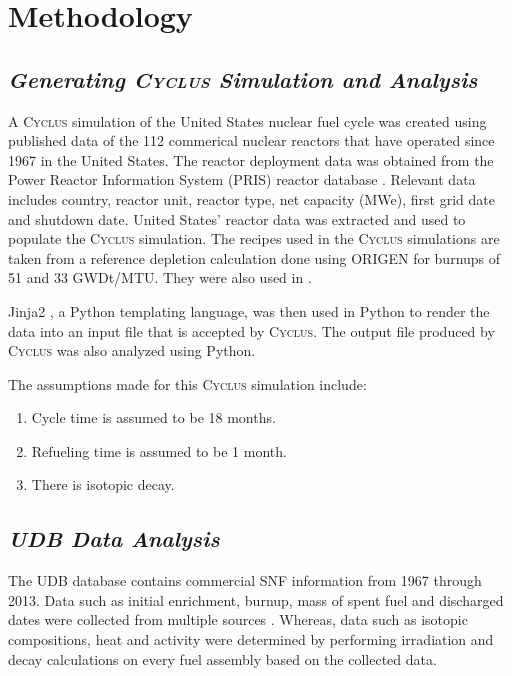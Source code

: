 \documentclass{anstrans}
\newcommand{\Cyclus}{\textsc{Cyclus}\xspace}%
\begin{document}
\section{Methodology}
\subsection{\textit{Generating \Cyclus Simulation and Analysis}}
A \Cyclus simulation of the United States nuclear fuel cycle was created using published data of the 112 commerical nuclear reactors that have operated since 1967 in the United States. The reactor deployment data was obtained from the Power Reactor Information System (PRIS) reactor database \cite{IAEA_pris_2017}. Relevant data includes country, reactor unit, reactor type, net capacity (MWe), first grid date and shutdown date. United States' reactor data was extracted and used to populate the \Cyclus simulation. The recipes used in the \Cyclus simulations are taken from a reference depletion calculation done using ORIGEN \cite{bell_origen_1973} for burnups of 51 and 33 GWDt/MTU. They were also used in \cite{wilson_adoption_2009, bae_synergistic_2017}. 

Jinja2 \cite{ronacher_welcome_2018}, a Python templating language, was then used in Python to render the data into an input file that is accepted by \Cyclus. The output file produced by \Cyclus was also analyzed using Python. 

The assumptions made for this \Cyclus simulation include: 

\begin{enumerate}
	\item Cycle time is assumed to be 18 months. 
	\item Refueling time is assumed to be 1 month. 
	\item There is isotopic decay. 
\end{enumerate}

\subsection{\textit{UDB Data Analysis}}
The UDB database contains commercial SNF information from 1967 through 2013. Data such as initial enrichment, burnup, mass of spent fuel and discharged dates were collected from multiple sources \cite{peterson_additional_2017}. Whereas, data such as isotopic compositions, heat and activity were determined by performing irradiation and decay calculations on every fuel assembly based on the collected data. 
\end{document}
